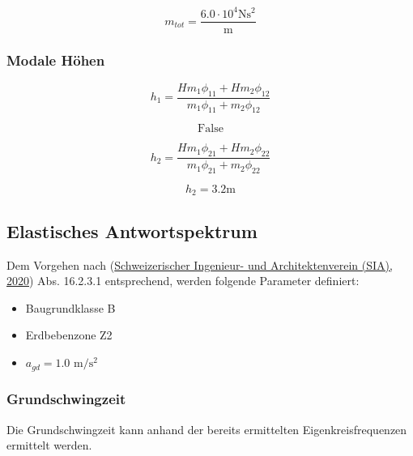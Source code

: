\documentclass[
  letterpaper,
  DIV=11]{scrreprt}
\providecommand{\tightlist}{%
  \setlength{\itemsep}{0pt}\setlength{\parskip}{0pt}}\usepackage{longtable,booktabs,array}
\begin{document}
\begin{equation*}m_{tot} = \frac{6.0 \cdot 10^{4} \text{N} \text{s}^{2}}{\text{m}}\end{equation*}

\hypertarget{modale-huxf6hen}{%
\subsubsection{Modale Höhen}\label{modale-huxf6hen}}

\begin{equation*}h_{1} = \frac{H m_{1} \phi_{11} + H m_{2} \phi_{12}}{m_{1} \phi_{11} + m_{2} \phi_{12}}\end{equation*}

\begin{equation*}\text{False}\end{equation*}

\begin{equation*}h_{2} = \frac{H m_{1} \phi_{21} + H m_{2} \phi_{22}}{m_{1} \phi_{21} + m_{2} \phi_{22}}\end{equation*}

\begin{equation*}h_{2} = 3.2 \text{m}\end{equation*}

\hypertarget{elastisches-antwortspektrum}{%
\subsection{Elastisches
Antwortspektrum}\label{elastisches-antwortspektrum}}

Dem Vorgehen nach (\protect\hyperlink{ref-SIA261_2020}{Schweizerischer
Ingenieur- und Architektenverein (SIA), 2020}) Abs. 16.2.3.1
entsprechend, werden folgende Parameter definiert:

\begin{itemize}
\tightlist
\item
  Baugrundklasse B
\item
  Erdbebenzone Z2
\item
  \(a_{gd} = 1.0 \text{ m}/\text{s}^2\)
\end{itemize}

\hypertarget{grundschwingzeit}{%
\subsubsection{Grundschwingzeit}\label{grundschwingzeit}}

Die Grundschwingzeit kann anhand der bereits ermittelten
Eigenkreisfrequenzen ermittelt werden.
\end{document}
